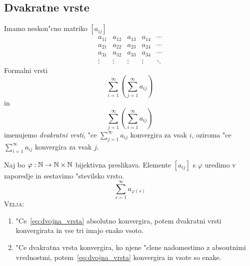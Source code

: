 \subsection{Dvakratne vrste}
Imamo neskon"cno matriko $[a_{ij}]$
\begin{equation*}
\begin{matrix}
a_{11} & a_{12} & a_{13} & a_{14} & \cdots \\
a_{21} & a_{22} & a_{23} & a_{24} & \cdots \\
a_{31} & a_{32} & a_{33} & a_{34} & \cdots \\
\vdots & \vdots & \vdots & \vdots & \ddots
\end{matrix}
\end{equation*}
Formalni vrsti
\begin{equation*}
\sum_{i=1}^{\infty} \left(\sum_{j=1}^{\infty}a_{ij}\right)
\end{equation*}
in
\begin{equation*}
\sum_{j=1}^{\infty} \left(\sum_{i=1}^{\infty}a_{ij}\right)
\end{equation*}
imenujemo \emph{dvakratni vrsti}, "ce $\sum_{j=1}^{\infty}a_{ij}$ konvergira za vsak $i$, oziroma "ce $\sum_{i = 1}^{\infty} a_{ij}$ konvergira za vsak $j$.

Naj bo $\varphi: \mathbb{N} \to \mathbb{N} \times \mathbb{N}$ bijektivna preslikava. Elemente $[a_{ij}]$ s $\varphi$ uredimo v zaporedje in sestavimo "stevilsko vrsto.
\begin{equation}
\label{eq:dvojna_vrsta}
\sum_{s=1}^{\infty}a_{\varphi(s)}
\end{equation}
\textsc{Velja:}
\begin{enumerate}[1)]
	\item "Ce~\ref{eq:dvojna_vrsta} absolutno konvergira, potem dvakratni vrsti konvergirata in vse tri imajo enako vsoto.
	\item "Ce dvakratna vrsta konvergira, ko njene "clene nadomestimo z absoutnimi vrednostmi, potem~\ref{eq:dvojna_vrsta} konvergira in vsote so enake.
\end{enumerate}